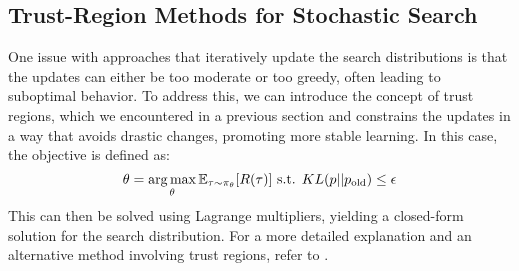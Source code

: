 \subsection{Trust-Region Methods for Stochastic Search}\label{trust_regions_es}
One issue with approaches that iteratively update the search distributions is that the updates can either be too moderate or 
too greedy, often leading to suboptimal behavior. To address this, we can introduce the concept of trust regions, which we 
encountered in a previous section and constrains the updates in a way that avoids drastic changes, promoting more stable 
learning. In this case, the objective is defined as:
$$\theta = \operatorname*{arg\,max}\limits_\theta \mathbb{E}_{\tau \sim \pi_\theta }[R(\tau)] \text{ s.t. } KL(p||p_\text{old}) \leq 
\epsilon$$
This can then be solved using Lagrange multipliers, yielding a closed-form solution for the search distribution. For a more 
detailed explanation and an alternative method involving trust regions, refer to \cite{JMLR:v25:22-0564}.

